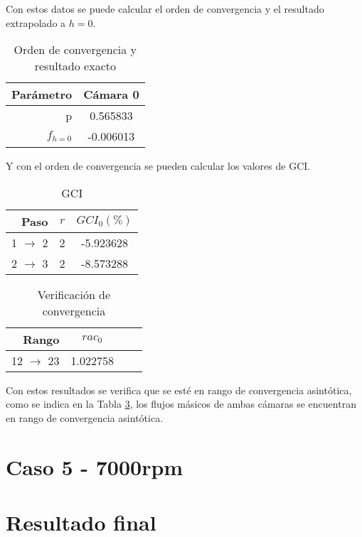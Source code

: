 Con estos datos se puede calcular el orden de convergencia y el resultado
extrapolado a $h=0$.

\begin{table}[h]
    \centering
    \begin{tabular}{rc}\toprule
        Parámetro & Cámara 0  \\ \midrule
        p         &  0.565833 \\
        $f_{h=0}$ & -0.006013 \\ \bottomrule
    \end{tabular}
    \caption{Orden de convergencia y resultado exacto}
    \label{tab:res1_caso5}
\end{table}

Y con el orden de convergencia se pueden calcular los valores de GCI.

\begin{table}
    \centering
    \begin{tabular}{rcc}\toprule
        Paso              & $r$ & $GCI_0(\%)$ \\ \midrule
        1 $\rightarrow$ 2 & 2   & -5.923628   \\
        2 $\rightarrow$ 3 & 2   & -8.573288   \\ \bottomrule
    \end{tabular}
    \caption{GCI}
    \label{tab:gci_caso_5}
\end{table}

\begin{table}
    \centering
    \begin{tabular}{rccc}\toprule
        Rango               & $rac_0$  \\ \midrule
        12 $\rightarrow$ 23 & 1.022758 \\ \bottomrule
    \end{tabular}
    \caption{Verificación de convergencia}
    \label{tab:rac_caso_5}
\end{table}

Con estos resultados se verifica que se esté en rango de convergencia
asintótica, como se indica en la Tabla \ref{tab:rac_caso_5}, los flujos
másicos de ambas cámaras se encuentran en rango de convergencia asintótica.

\section{Caso 5 - 7000rpm}

\section{Resultado final}


